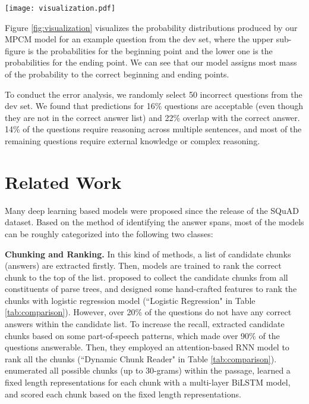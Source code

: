 \documentclass[11pt,letterpaper]{article}
\begin{document}
\begin{figure*}[tbp]
\begin{center}
\texttt{[image: visualization.pdf]}
\end{center}
\caption{Probability distributions for the question ``What did Luther consider Christ 's life ?", where the correct answer is ``an illustration of the Ten Commandments", the upper sub-figure is for the beginning point and the lower one is for the ending point.}
\label{fig:visualization}
\end{figure*}

Figure \ref{fig:visualization} visualizes the probability distributions produced by our MPCM model for an example question from the dev set, where the upper sub-figure is the probabilities for the beginning point and the lower one is the probabilities for the ending point. We can see that our model assigns most mass of the probability to the correct beginning and ending points.

To conduct the error analysis, we randomly select 50 incorrect questions from the dev set. We found that predictions for 16\% questions are acceptable (even though they are not in the correct answer list) and 22\% overlap with the correct answer. 14\% of the questions require reasoning across multiple sentences, and most of the remaining questions require external knowledge or complex reasoning.

\section{Related Work}
Many deep learning based models were proposed since the release of the SQuAD dataset. Based on the method of identifying the answer spans, most of the models can be roughly categorized into the following two classes:

\textbf{Chunking and Ranking.} In this kind of methods, a list of candidate chunks (answers) are extracted firstly. Then, models are trained to rank the correct chunk to the top of the list.  proposed to collect the candidate chunks from all constituents of parse trees, and designed some hand-crafted features to rank the chunks with logistic regression model (``Logistic Regression" in Table \ref{tab:comparison}). However, over 20\% of the questions do not have any correct answers within the candidate list. To increase the recall,  extracted candidate chunks based on some part-of-speech patterns, which made over 90\% of the questions answerable. Then, they employed an attention-based RNN model to rank all the chunks (``Dynamic Chunk Reader" in Table \ref{tab:comparison}).  enumerated all possible chunks (up to 30-grams) within the passage, learned a fixed length representations for each chunk with a multi-layer BiLSTM model, and scored each chunk based on the fixed length representations.
\end{document}
